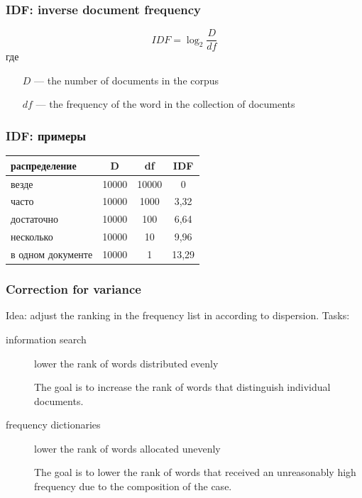 \documentclass[svgnames]{beamer}
\begin{document}
\begin{frame}
  \frametitle{IDF: inverse document frequency}
  \begin{equation}
    IDF=\log_2\frac{D}{df}
  \end{equation}
  где
  \begin{itemize}
  \item[$D$] — the number of documents in the corpus
  \item[$df$] — the frequency of the word in the collection of documents
  \end{itemize}
\end{frame}

\begin{frame}
  \frametitle{IDF: примеры}
  \begin{tabular}[l]{lccc}
    распределение & D & df & IDF \\
    \hline
    везде & 10000 & 10000 & 0 \\
    часто & 10000 & 1000 & 3,32 \\
    достаточно & 10000 & 100 & 6,64 \\
    несколько & 10000 & 10 & 9,96 \\
    в одном документе & 10000 & 1 & 13,29 \\
  \end{tabular}
\end{frame}


\begin{frame}
  \frametitle{Correction for variance}
  Idea: adjust the ranking in the frequency list in
  according to dispersion. Tasks:
  \begin{description}
  \item[information search] lower the rank of words distributed  evenly

    The goal is to increase the rank of words that distinguish individual documents.

  \item[frequency dictionaries] lower the rank of words allocated unevenly

    The goal is to lower the rank of words that received an unreasonably high
    frequency due to the composition of the case.
  \end{description}
\end{frame}
\end{document}
